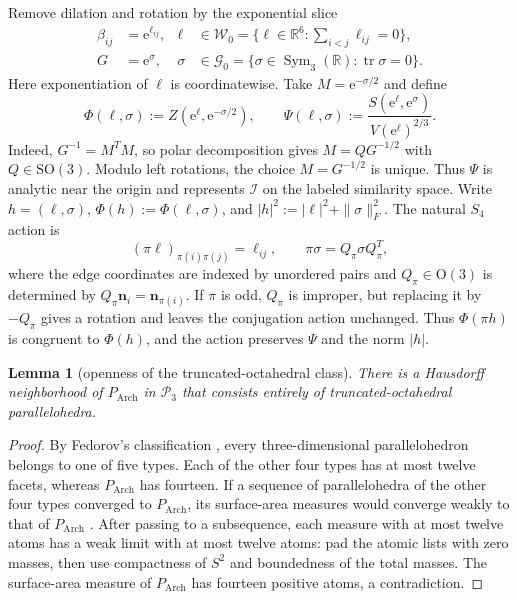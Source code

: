 \documentclass[11pt]{article}
\newcommand{\R}{\mathbb R}
\newcommand{\tr}{\operatorname{tr}}
\newcommand{\Sym}{\operatorname{Sym}}
\newcommand{\Arch}{P_{\mathrm{Arch}}}
\newcommand{\Ical}{\mathcal I}
\newcommand{\mb}[1]{\mathbf{#1}}
\newcommand{\e}{\mathrm e}
\newtheorem{lemma}[lemma]{Lemma}
\theoremstyle{remark}
\begin{document}
Remove dilation and rotation by the exponential slice
\begin{equation}\label{eq:exp-chart}
\begin{aligned}
 \beta_{ij}&=\e^{\ell_{ij}}, &
 \ell&\in\mathcal W_0=
 \{\ell\in\R^6:\sum_{i<j}\ell_{ij}=0\},\\
 G&=\e^\sigma, &
 \sigma&\in\mathcal G_0=
 \{\sigma\in\Sym_3(\R):\tr\sigma=0\}.
\end{aligned}
\end{equation}
Here exponentiation of $\ell$ is coordinatewise.  
Take $M=\e^{-\sigma/2}$ and define
\begin{equation}\label{eq:Psi}
 \Phi(\ell,\sigma):=Z(\e^\ell,\e^{-\sigma/2}),
 \qquad
 \Psi(\ell,\sigma):=\frac{S(\e^\ell,\e^\sigma)}{V(\e^\ell)^{2/3}}.
\end{equation}
Indeed, $G^{-1}=M^TM$, so polar decomposition gives $M=QG^{-1/2}$ with $Q\in\mathrm{SO}(3)$. 
Modulo left rotations, the choice $M=G^{-1/2}$ is unique.
Thus $\Psi$ is analytic near the origin and represents $\Ical$ on the labeled similarity
space.  Write $h=(\ell,\sigma)$, $\Phi(h):=\Phi(\ell,\sigma)$, and
$|h|^2:=|\ell|^2+\|\sigma\|_F^2$.
%
The natural $S_4$ action is
\[
 (\pi\ell)_{\pi(i)\pi(j)}=\ell_{ij},
 \qquad \pi\sigma=Q_\pi\sigma Q_\pi^T,
\]
where the edge coordinates are indexed by unordered pairs and
$Q_\pi\in\mathrm O(3)$ is determined by $Q_\pi\mb n_i=\mb n_{\pi(i)}$.  If $\pi$ is odd,
$Q_\pi$ is improper, but replacing it by $-Q_\pi$ gives a rotation and leaves the
conjugation action unchanged.  Thus $\Phi(\pi h)$ is congruent to $\Phi(h)$, and the action
preserves $\Psi$ and the norm $|h|$.

\begin{lemma}[openness of the truncated-octahedral class]\label{lem:open-class}
There is a Hausdorff neighborhood of $\Arch$ in $\mathcal P_3$ that consists entirely of
truncated-octahedral parallelohedra.
\end{lemma}

\begin{proof}
By Fedorov's classification \cite{Fedorov1885}, every three-dimensional
parallelohedron belongs to one of five types.  Each of the other four types has at most
twelve facets, whereas $\Arch$ has fourteen.  If a sequence of parallelohedra of the other four types converged to $\Arch$,
its surface-area measures would converge weakly to that of $\Arch$
\cite[Thm.~4.2.1]{Schneider2014}.  After passing to a subsequence, each measure with at
most twelve atoms has a weak limit with at most twelve atoms: pad the atomic lists with
zero masses, then use compactness of $S^2$ and boundedness of the total masses.  The
surface-area measure of $\Arch$ has fourteen positive atoms, a contradiction.
\end{proof}
\end{document}
